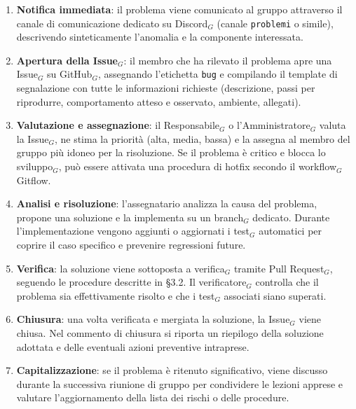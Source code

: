 \documentclass[a4paper, 10pt]{article}
\begin{document}
\begin{enumerate}
    \item \textbf{Notifica immediata}: il problema viene comunicato al gruppo attraverso il canale di comunicazione dedicato su Discord$_G$ (canale \texttt{problemi} o simile), descrivendo sinteticamente l'anomalia e la componente interessata.
    
    \item \textbf{Apertura della Issue$_G$}: il membro che ha rilevato il problema apre una Issue$_G$ su GitHub$_G$, assegnando l'etichetta \texttt{bug} e compilando il template di segnalazione con tutte le informazioni richieste (descrizione, passi per riprodurre, comportamento atteso e osservato, ambiente, allegati).
    
    \item \textbf{Valutazione e assegnazione}: il Responsabile$_G$ o l'Amministratore$_G$ valuta la Issue$_G$, ne stima la priorità (alta, media, bassa) e la assegna al membro del gruppo più idoneo per la risoluzione. Se il problema è critico e blocca lo sviluppo$_G$, può essere attivata una procedura di hotfix secondo il workflow$_G$ Gitflow.
    
    \item \textbf{Analisi e risoluzione}: l'assegnatario analizza la causa del problema, propone una soluzione e la implementa su un branch$_G$ dedicato. Durante l'implementazione vengono aggiunti o aggiornati i test$_G$ automatici per coprire il caso specifico e prevenire regressioni future.
    
    \item \textbf{Verifica}: la soluzione viene sottoposta a verifica$_G$ tramite Pull Request$_G$, seguendo le procedure descritte in §3.2. Il verificatore$_G$ controlla che il problema sia effettivamente risolto e che i test$_G$ associati siano superati.
    
    \item \textbf{Chiusura}: una volta verificata e mergiata la soluzione, la Issue$_G$ viene chiusa. Nel commento di chiusura si riporta un riepilogo della soluzione adottata e delle eventuali azioni preventive intraprese.
    
    \item \textbf{Capitalizzazione}: se il problema è ritenuto significativo, viene discusso durante la successiva riunione di gruppo per condividere le lezioni apprese e valutare l'aggiornamento della lista dei rischi o delle procedure.
\end{enumerate}
\end{document}
